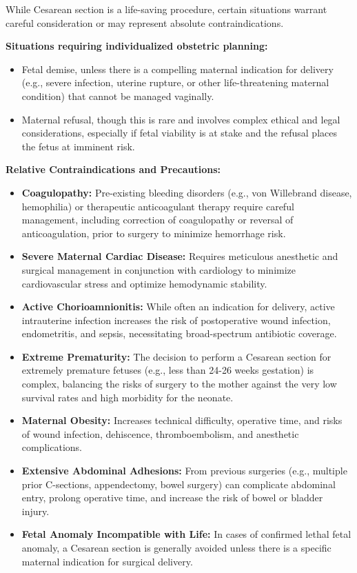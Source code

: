 While Cesarean section is a life-saving procedure, certain situations warrant careful consideration or may represent absolute contraindications.

\textbf{Situations requiring individualized obstetric planning:}
\begin{itemize}
  \item Fetal demise, unless there is a compelling maternal indication for delivery (e.g., severe infection, uterine rupture, or other life-threatening maternal condition) that cannot be managed vaginally.
  \item Maternal refusal, though this is rare and involves complex ethical and legal considerations, especially if fetal viability is at stake and the refusal places the fetus at imminent risk.
\end{itemize}

\textbf{Relative Contraindications and Precautions:}
\begin{itemize}
  \item \textbf{Coagulopathy:} Pre-existing bleeding disorders (e.g., von Willebrand disease, hemophilia) or therapeutic anticoagulant therapy require careful management, including correction of coagulopathy or reversal of anticoagulation, prior to surgery to minimize hemorrhage risk.
  \item \textbf{Severe Maternal Cardiac Disease:} Requires meticulous anesthetic and surgical management in conjunction with cardiology to minimize cardiovascular stress and optimize hemodynamic stability.
  \item \textbf{Active Chorioamnionitis:} While often an indication for delivery, active intrauterine infection increases the risk of postoperative wound infection, endometritis, and sepsis, necessitating broad-spectrum antibiotic coverage.
  \item \textbf{Extreme Prematurity:} The decision to perform a Cesarean section for extremely premature fetuses (e.g., less than 24-26 weeks gestation) is complex, balancing the risks of surgery to the mother against the very low survival rates and high morbidity for the neonate.
  \item \textbf{Maternal Obesity:} Increases technical difficulty, operative time, and risks of wound infection, dehiscence, thromboembolism, and anesthetic complications.
  \item \textbf{Extensive Abdominal Adhesions:} From previous surgeries (e.g., multiple prior C-sections, appendectomy, bowel surgery) can complicate abdominal entry, prolong operative time, and increase the risk of bowel or bladder injury.
  \item \textbf{Fetal Anomaly Incompatible with Life:} In cases of confirmed lethal fetal anomaly, a Cesarean section is generally avoided unless there is a specific maternal indication for surgical delivery.
\end{itemize}

